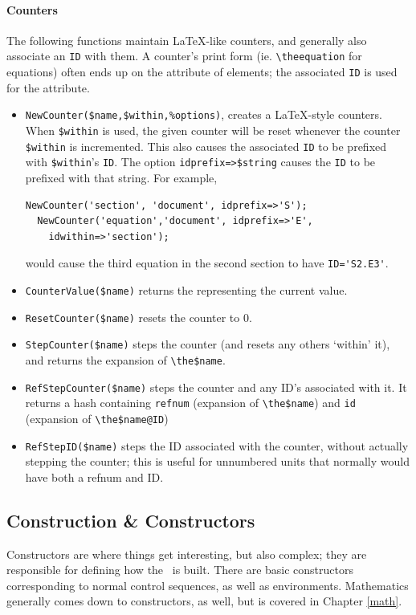 \documentclass{book}
\newcommand{\ltxcode}{\lstinline[style=inlinelatexml]}
\newcommand{\xmlcode}{\lstinline[style=xml]}
\begin{document}
\paragraph{Counters}
The following functions maintain \LaTeX-like counters, and generally
also associate an \texttt{ID} with them.  A counter's print form
(ie. \verb|\theequation| for equations) often ends up on the  attribute
of elements; the associated \texttt{ID} is used for the  attribute.
\begin{itemize}
\item \ltxcode|NewCounter($name,$within,%
  creates a \LaTeX-style counters.  When \ltxcode|$within| is used, 
  the given counter will be reset whenever the counter \ltxcode|$within| is incremented.
  This also causes the associated \texttt{ID} to be prefixed with \ltxcode|$within|'s \texttt{ID}.
  The option \ltxcode|idprefix=>$string| causes the \texttt{ID} to be prefixed with that string.
  For example,
\begin{lstlisting}[style=latexml]
  NewCounter('section', 'document', idprefix=>'S');
  NewCounter('equation','document', idprefix=>'E',
    idwithin=>'section');
\end{lstlisting}
would cause the third equation in the second section to have \xmlcode{ID='S2.E3'}.
\item  \ltxcode|CounterValue($name)| returns the  representing the current value.
\item  \ltxcode|ResetCounter($name)| resets the counter to 0.
\item \ltxcode|StepCounter($name)| steps the counter (and resets any others `within' it),
  and returns the expansion of \verb|\the$name|.
\item \ltxcode|RefStepCounter($name)| steps the counter and any ID's associated with it.
  It returns a hash containing \texttt{refnum} (expansion of \verb|\the$name|)
  and \texttt{id} (expansion of \verb|\the$name@ID|)
\item \ltxcode|RefStepID($name)| steps the ID associated with the counter, without
  actually stepping the counter; this is useful for unnumbered units that normally
  would have both a refnum and ID.
\end{itemize}

\subsection[Construction]{Construction \& Constructors}\label{customization.latexml.construction}
Constructors are where things get interesting, but also complex; they are
responsible for defining how the \XML\ is built.  There are basic
constructors corresponding to normal control sequences, as well as
environments. Mathematics generally comes down to constructors, as well,
but is covered in Chapter \ref{math}.
\end{document}
